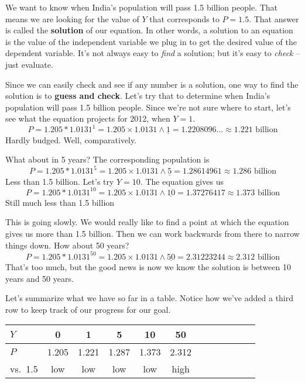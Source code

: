 We want to know when India's population will pass 1.5 billion people.  That means we are looking for the value of $Y$ that corresponds to $P=1.5$.  That answer is called the \textbf{solution} of our equation.  In other words, a solution to an equation is the value of the independent variable we plug in to get the desired value of the dependent variable.  It's not always easy to \emph{find} a solution; but it's easy to \emph{check} -- just evaluate.

Since we can easily check and see if any number is a solution, one way to find the solution is to \textbf{guess and check}.  Let's try that to determine when India's population will pass 1.5 billion people.  Since we're not sure where to start, let's see what the equation projects for 2012, when $Y=1$. 
$$P=1.205 \ast 1.0131^1 = 1.205 \times 1.0131 \wedge \underline{1} = 1.2208096... \approx 1.221 \text{ billion}$$ 
Hardly budged.  Well, comparatively.  

What about in 5 years?  The corresponding population is 
$$P=1.205 \ast 1.0131^5 = 1.205 \times 1.0131 \wedge \underline{5} = 1.28614961\approx  1.286\text{ billion}$$ 
Less than 1.5 billion.  Let's try $Y=10$. The equation gives us 
$$P=1.205 \ast 1.0131^{10} = 1.205 \times 1.0131 \wedge \underline{10} = 1.37276417 \approx 1.373 \text{ billion}$$ 
Still much less than 1.5 billion

This is going slowly.  We would really like to find a point at which the equation gives us more than 1.5 billion. Then we can work backwards from there to narrow things down.  How about 50 years?  
$$P=1.205 \ast 1.0131^{50} = 1.205 \times 1.0131 \wedge \underline{50} = 2.31223244  \approx 2.312\text{ billion}$$ 
That's too much, but the good news is now we know the solution is between 10 years and 50 years.  

Let's summarize what we have so far in a table.  Notice how we've added a third row to keep track of our progress for our goal.
\begin{center}
\begin{tabular} {|l| |c |c |c |c |c |c |c |c |c|}\hline
$Y$ & 0 & 1 & 5 & 10 & 50 & \hspace{.25in}~&\hspace{.25in}~&\hspace{.25in}~&\hspace{.25in}~ \\ \hline
$P$ & 1.205 & 1.221 &1.287  & 1.373 & 2.312 &&&&  \\ \hline
vs.\ 1.5 & low & low & low & low & high &&&& \\ \hline
\end{tabular}
\end{center}

